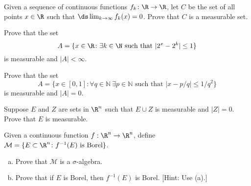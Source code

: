 \begin{hw} \label{hw:6}
Given a sequence of continuous functions $f_k \colon \R \to \R$, let $C$ be the set of all points $x \in \R$ such that $\ds \lim_{k \to \infty} f_k(x)= 0$. Prove that $C$ is a measurable set. \\
\end{hw}






\begin{hw} \label{hw:7}
Prove that the set
	\[
	A= \{ x \in \R \colon \exists k \in \N \text{ such that } |2^x-2^k| \leq 1 \}
	\]
is measurable and $|A| < \infty$. \\
\end{hw}


\begin{hw} \label{hw:8}
Prove that the set
	\[
	A = \{x\in [0, 1] \colon \forall q\in \mathbb N \ \exists p\in\mathbb N \text{ such that } |x-p/q|\le 1/q^2\}
	\]
is measurable and $|A|=0$. \\
\end{hw}


\begin{hw} \label{hw:9}
Suppose $E$ and $Z$ are sets in $\R^n$ such that $E \cup Z$ is measurable and $|Z|=0$. Prove that $E$ is measurable. \\
\end{hw}


\begin{hw} \label{hw:10}
Given a continuous function $f:  \R^n \to \R^n$, define $\mathcal{M}= \{ E \subset \R^n \colon f^{-1}(E) \text{ is Borel} \}$. 
	\begin{enumerate}[(a)]
	\item Prove that $\mathcal{M}$ is a $\sigma$-algebra.
	\item Prove that if $E$ is Borel, then $f^{-1}(E)$ is Borel. [Hint: Use (a).] \\
	\end{enumerate}
\end{hw}







